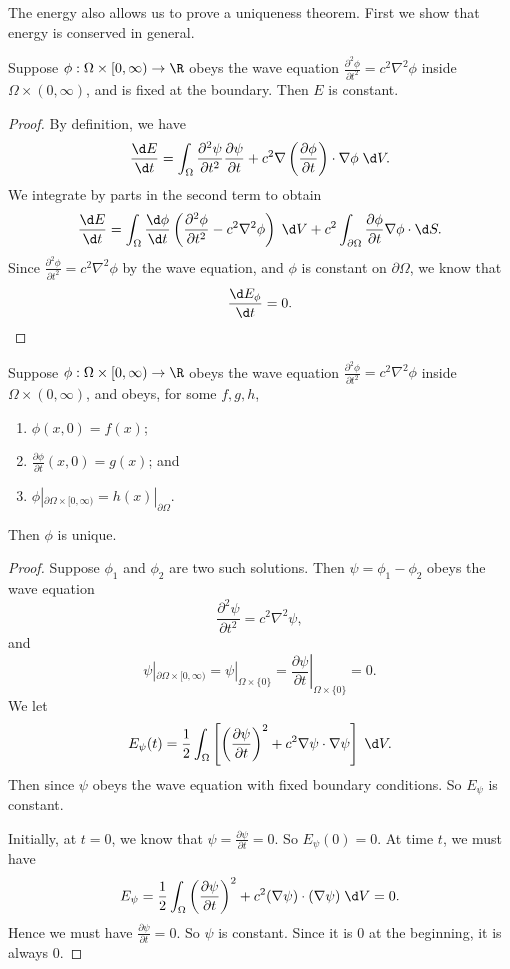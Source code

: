 \documentclass[a4paper]{article}
\begin{document}
The energy also allows us to prove a uniqueness theorem. First we show that energy is conserved in general.

\begin{prop}
  Suppose $\phi: \Omega \times [0, \infty) \to \R$ obeys the wave equation $\frac{\partial^2 \phi}{\partial t^2} = c^2 \nabla^2 \phi$ inside $\Omega \times (0, \infty)$, and is fixed at the boundary. Then $E$ is constant.
\end{prop}

\begin{proof}
  By definition, we have
  \[
    \frac{\d E}{\d t} = \int_\Omega \frac{\partial^2 \psi}{\partial t^2}\frac{\partial \psi}{\partial t} + c^2 \nabla \left(\frac{\partial \phi}{\partial t}\right)\cdot \nabla \phi \;\d V.
  \]
  We integrate by parts in the second term to obtain
  \[
    \frac{\d E}{\d t} = \int_\Omega \frac{\d \phi}{\d t}\left(\frac{\partial^2 \phi}{\partial t^2} - c^2 \nabla^2 \phi\right)\;\d V + c^2 \int_{\partial \Omega} \frac{\partial \phi}{\partial t}\nabla \phi \cdot \d S.
  \]
  Since $\frac{\partial^2 \phi}{\partial t^2} = c^2 \nabla^2 \phi$ by the wave equation, and $\phi$ is constant on $\partial \Omega$, we know that
  \[
    \frac{\d E_\phi}{\d t} = 0.
  \]
\end{proof}

\begin{prop}
  Suppose $\phi: \Omega \times [0, \infty) \to \R$ obeys the wave equation $\frac{\partial^2 \phi}{\partial t^2} = c^2 \nabla^2 \phi$ inside $\Omega \times (0, \infty)$, and obeys, for some $f, g, h$,
  \begin{enumerate}
    \item $\phi(x, 0) = f(x)$;
    \item $\frac{\partial \phi}{\partial t}(x, 0) = g(x)$; and
    \item $\phi|_{\partial \Omega\times [0, \infty)} = h(x)|_{\partial \Omega}$.
  \end{enumerate}
  Then $\phi$ is unique.
\end{prop}
\begin{proof}
  Suppose $\phi_1$ and $\phi_2$ are two such solutions. Then $\psi = \phi_1 - \phi_2$ obeys the wave equation
  \[
    \frac{\partial^2 \psi}{\partial t^2} = c^2 \nabla^2 \psi,
  \]
  and 
  \[
    \psi|_{\partial \Omega \times [0, \infty)} = \psi|_{\Omega \times \{0\}} = \left.\frac{\partial \psi}{\partial t}\right|_{\Omega \times \{0\}} = 0.
  \]
  We let
  \[
    E_\psi(t) = \frac{1}{2}\int_\Omega \left[\left(\frac{\partial \psi}{\partial t}\right)^2 + c^2 \nabla \psi \cdot \nabla \psi\right] \;\d V.
  \]
  Then since $\psi$ obeys the wave equation with fixed boundary conditions. So $E_\psi$ is constant.

  Initially, at $t = 0$, we know that $\psi = \frac{\partial \psi}{\partial t} = 0$. So $E_\psi(0) = 0$. At time $t$, we must have
  \[
    E_\psi = \frac{1}{2}\int_\Omega \left(\frac{\partial \psi}{\partial t}\right)^2 + c^2 (\nabla \psi)\cdot (\nabla \psi) \;\d V = 0.
  \]
  Hence we must have $\frac{\partial \psi}{\partial t} = 0$. So $\psi$ is constant. Since it is $0$ at the beginning, it is always $0$.
\end{proof}
\end{document}
